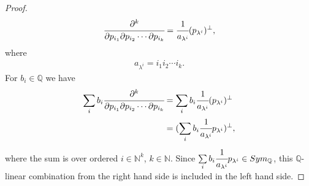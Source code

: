 \documentclass[8pt]{extarticle}
\newcommand{\N}{\mathbb{N}}
\newcommand{\Q}{\mathbb{Q}}
\newcommand{\<}{\langle}
\renewcommand{\>}{\rangle}
\theoremstyle{definition}
\begin{document}
\begin{proof}
  \begin{align*}
    \cfrac{\partial^k}{\partial p_{i_1} \partial p_{i_2} \cdots \partial p_{i_k}} = \cfrac{1}{a_{\lambda^i}} (p_{\lambda^i})^{\perp},
  \end{align*}
  where
  \begin{align*}
    a_{\lambda^i} = i_1 i_2 \cdots i_k.
  \end{align*}
  For $b_{i} \in \Q$ we have
  \begin{align*}
    \sum\limits_{i} b_{i}\cfrac{\partial^k}{\partial p_{i_1} \partial p_{i_2} \cdots \partial p_{i_k}}
    &=
    \sum\limits_{i} b_{i}\cfrac{1}{a_{\lambda^i}} (p_{\lambda^i})^{\perp} \\
    &=
    (\sum\limits_{i} b_{i}\cfrac{1}{a_{\lambda^i}}p_{\lambda^i})^{\perp},
  \end{align*}
  where the sum is over ordered $i \in \N^k$, $k \in \N$. Since $\sum\limits_{i} b_{i}\cfrac{1}{a_{\lambda^i}}p_{\lambda^i} \in Sym_{\Q}$, this $\Q$-linear combination from the right hand side is included in the left hand side.
\end{proof}
\end{document}
